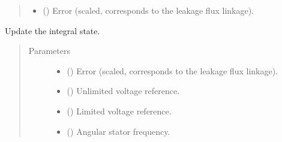 \documentclass[letterpaper,10pt,english]{sphinxmanual}
\begin{document}
\begin{fulllineitems}
\begin{fulllineitems}
\begin{quote}
\begin{description}
\begin{itemize}
\item {} 
\sphinxAtStartPar
{} () \textendash{} Error (scaled, corresponds to the leakage flux linkage).

\end{itemize}


\end{description}\end{quote}

\end{fulllineitems}


\begin{fulllineitems}
\label{\detokenize{control.im:control.im.vector.CurrentCtrl.update}}
\pysigstartsignatures
{}
\pysigstopsignatures
\sphinxAtStartPar
Update the integral state.
\begin{quote}\begin{description}
\item[{Parameters}] \leavevmode\begin{itemize}
\item {} 
\sphinxAtStartPar
{} () \textendash{} Error (scaled, corresponds to the leakage flux linkage).

\item {} 
\sphinxAtStartPar
{} () \textendash{} Unlimited voltage reference.

\item {} 
\sphinxAtStartPar
{} () \textendash{} Limited voltage reference.

\item {} 
\sphinxAtStartPar
{} () \textendash{} Angular stator frequency.

\end{itemize}

\end{description}\end{quote}

\end{fulllineitems}


\end{fulllineitems}
\end{document}
